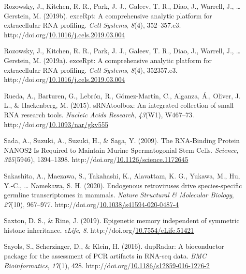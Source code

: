 \documentclass[12pt,twoside]{reedthesis}
\newlength{\cslhangindent}
\newenvironment{CSLReferences}[2] %
 {%
  \setlength{\parindent}{0pt}
  \ifodd #1 \everypar{\setlength{\hangindent}{\cslhangindent}}\ignorespaces\fi
  \ifnum #2 > 0
  \setlength{\parskip}{#2\baselineskip}
  \fi
 }%
 {}
\begin{document}
\begin{CSLReferences}{1}{0}
\leavevmode{}%
Rozowsky, J., Kitchen, R. R., Park, J. J., Galeev, T. R., Diao, J., Warrell, J., \ldots{} Gerstein, M. (2019b). {exceRpt}: A comprehensive analytic platform for extracellular {RNA} profiling. \emph{Cell Systems}, \emph{8}(4), 352--357.e3. http://doi.org/\href{https://doi.org/10.1016/j.cels.2019.03.004}{10.1016/j.cels.2019.03.004}

\leavevmode{}%
Rozowsky, J., Kitchen, R. R., Park, J. J., Galeev, T. R., Diao, J., Warrell, J., \ldots{} Gerstein, M. (2019a). exceRpt: A comprehensive analytic platform for extracellular RNA profiling. \emph{Cell Systems}, \emph{8}(4), 352357.e3. http://doi.org/\href{https://doi.org/10.1016/j.cels.2019.03.004}{10.1016/j.cels.2019.03.004}

\leavevmode{}%
Rueda, A., Barturen, G., Lebrón, R., Gómez-Martín, C., Alganza, Á., Oliver, J. L., \& Hackenberg, M. (2015). sRNAtoolbox: An integrated collection of small RNA research tools. \emph{Nucleic Acids Research}, \emph{43}(W1), W467--73. http://doi.org/\href{https://doi.org/10.1093/nar/gkv555}{10.1093/nar/gkv555}

\leavevmode{}%
Sada, A., Suzuki, A., Suzuki, H., \& Saga, Y. (2009). The RNA-Binding Protein NANOS2 Is Required to Maintain Murine Spermatogonial Stem Cells. \emph{Science}, \emph{325}(5946), 1394--1398. http://doi.org/\href{https://doi.org/10.1126/science.1172645}{10.1126/science.1172645}

\leavevmode{}%
Sakashita, A., Maezawa, S., Takahashi, K., Alavattam, K. G., Yukawa, M., Hu, Y.-C., \ldots{} Namekawa, S. H. (2020). Endogenous retroviruses drive species-specific germline transcriptomes in mammals. \emph{Nature Structural \& Molecular Biology}, \emph{27}(10), 967--977. http://doi.org/\href{https://doi.org/10.1038/s41594-020-0487-4}{10.1038/s41594-020-0487-4}

\leavevmode{}%
Saxton, D. S., \& Rine, J. (2019). Epigenetic memory independent of symmetric histone inheritance. \emph{eLife}, \emph{8}. http://doi.org/\href{https://doi.org/10.7554/eLife.51421}{10.7554/eLife.51421}

\leavevmode{}%
Sayols, S., Scherzinger, D., \& Klein, H. (2016). dupRadar: A bioconductor package for the assessment of PCR artifacts in RNA-seq data. \emph{BMC Bioinformatics}, \emph{17}(1), 428. http://doi.org/\href{https://doi.org/10.1186/s12859-016-1276-2}{10.1186/s12859-016-1276-2}


\end{CSLReferences}
\end{document}
